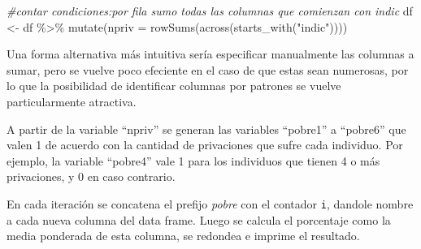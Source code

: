 \documentclass[
]{book}
\newenvironment{Shaded}{\begin{snugshade}}{\end{snugshade}}
\newcommand{\AttributeTok}[1]{\textcolor[rgb]{0.77,0.63,0.00}{#1}}
\newcommand{\CommentTok}[1]{\textcolor[rgb]{0.56,0.35,0.01}{\textit{#1}}}
\newcommand{\FunctionTok}[1]{\textcolor[rgb]{0.00,0.00,0.00}{#1}}
\newcommand{\NormalTok}[1]{#1}
\newcommand{\OtherTok}[1]{\textcolor[rgb]{0.56,0.35,0.01}{#1}}
\newcommand{\SpecialCharTok}[1]{\textcolor[rgb]{0.00,0.00,0.00}{#1}}
\newcommand{\StringTok}[1]{\textcolor[rgb]{0.31,0.60,0.02}{#1}}
\begin{document}
\begin{Shaded}
\begin{Highlighting}[]
\CommentTok{\#contar condiciones:por fila sumo todas las columnas que comienzan con indic}
\NormalTok{df }\OtherTok{\textless{}{-}}\NormalTok{ df }\SpecialCharTok{\%\textgreater{}\%} \FunctionTok{mutate}\NormalTok{(}\AttributeTok{npriv =} \FunctionTok{rowSums}\NormalTok{(}\FunctionTok{across}\NormalTok{(}\FunctionTok{starts\_with}\NormalTok{(}\StringTok{"indic"}\NormalTok{)))) }
\end{Highlighting}
\end{Shaded}

Una forma alternativa más intuitiva sería especificar manualmente las columnas a sumar, pero se vuelve poco efeciente en el caso de que estas sean numerosas, por lo que la posibilidad de identificar columnas por patrones se vuelve particularmente atractiva.

\begin{Shaded}
\end{Shaded}

A partir de la variable ``npriv'' se generan las variables ``pobre1'' a ``pobre6'' que valen 1 de acuerdo con la cantidad de privaciones que sufre cada individuo. Por ejemplo, la variable ``pobre4'' vale 1 para los individuos que tienen 4 o más privaciones, y 0 en caso contrario.

En cada iteración se concatena el prefijo \emph{pobre} con el contador \texttt{i}, dandole nombre a cada nueva columna del data frame. Luego se calcula el porcentaje como la media ponderada de esta columna, se redondea e imprime el resultado.
\end{document}
